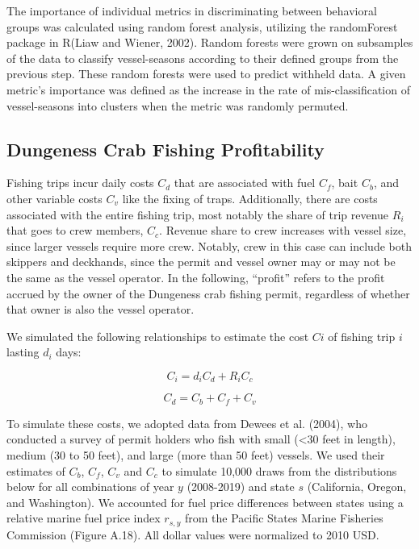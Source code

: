 \documentclass[]{elsarticle} %
\begin{document}
The importance of individual metrics in discriminating between
behavioral groups was calculated using random forest analysis, utilizing
the randomForest package in R(Liaw and Wiener, 2002). Random forests
were grown on subsamples of the data to classify vessel-seasons
according to their defined groups from the previous step. These random
forests were used to predict withheld data. A given metric's importance
was defined as the increase in the rate of mis-classification of
vessel-seasons into clusters when the metric was randomly permuted.

\hypertarget{dungeness-crab-fishing-profitability}{%
\subsection{Dungeness Crab Fishing
Profitability}\label{dungeness-crab-fishing-profitability}}

Fishing trips incur daily costs \(C_d\) that are associated with fuel
\(C_f\), bait \(C_b\), and other variable costs \(C_v\) like the fixing
of traps. Additionally, there are costs associated with the entire
fishing trip, most notably the share of trip revenue \(R_i\) that goes
to crew members, \(C_c\). Revenue share to crew increases with vessel
size, since larger vessels require more crew. Notably, crew in this case
can include both skippers and deckhands, since the permit and vessel
owner may or may not be the same as the vessel operator. In the
following, ``profit'' refers to the profit accrued by the owner of the
Dungeness crab fishing permit, regardless of whether that owner is also
the vessel operator.

We simulated the following relationships to estimate the cost \(Ci\) of
fishing trip \(i\) lasting \(d_i\) days:

\begin{equation}
  C_i = d_iC_d + R_iC_c 
\end{equation}

\begin{equation}
  C_d = C_b + C_f + C_v
\end{equation}

To simulate these costs, we adopted data from Dewees et al. (2004), who
conducted a survey of permit holders who fish with small (\textless30
feet in length), medium (30 to 50 feet), and large (more than 50 feet)
vessels. We used their estimates of \(C_b\), \(C_f\), \(C_v\) and
\(C_c\) to simulate 10,000 draws from the distributions below for all
combinations of year \(y\) (2008-2019) and state \(s\) (California,
Oregon, and Washington). We accounted for fuel price differences between
states using a relative marine fuel price index \(r_{s,y}\) from the
Pacific States Marine Fisheries Commission (Figure A.18). All dollar
values were normalized to 2010 USD.
\end{document}
